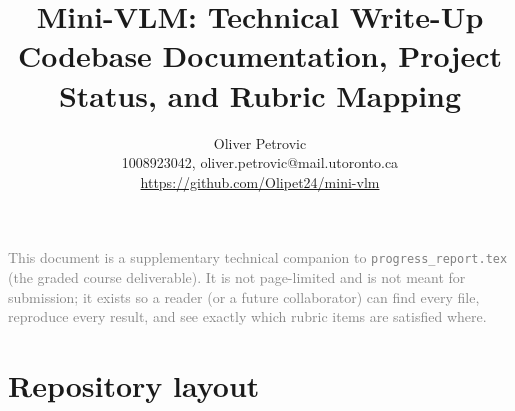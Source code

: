 \documentclass[final]{article}
\title{Mini-VLM: Technical Write-Up \\ \large Codebase Documentation, Project Status, and Rubric Mapping}
\author{%
  Oliver Petrovic \\
  1008923042, oliver.petrovic@mail.utoronto.ca\\
  \url{https://github.com/Olipet24/mini-vlm}\\
}
\begin{document}
\maketitle
\vspace{-0.4in}

\textcolor{gray}{\small This document is a supplementary technical companion to
\texttt{progress\_report.tex} (the graded course deliverable). It is not page-limited and is
not meant for submission; it exists so a reader (or a future collaborator) can find every file,
reproduce every result, and see exactly which rubric items are satisfied where.}

\section*{Repository layout}
\end{document}
